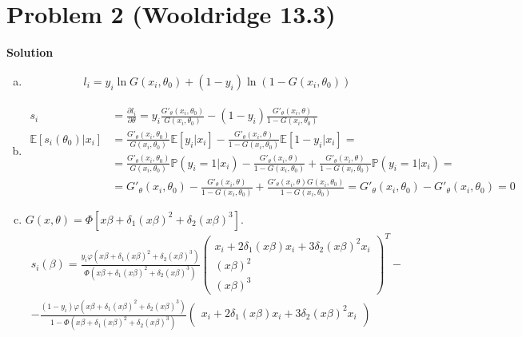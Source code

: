 \documentclass[a4paper]{article}
\newcommand{\prob}{\mathbb{P}}
\newcommand{\expect}{\mathbb{E}}
\begin{document}
	\section*{Problem 2 (Wooldridge 13.3)}
	
	
	
	
	\textbf{Solution}
	
	
	
	\begin{enumerate}[a.]
		\item 
		\begin{align*}
		l_i = y_i \ln G(x_i, \theta_0) + (1 - y_i) \ln (1 - G(x_i, \theta_0))
		\end{align*}
		\item 
		\begin{align*}
		s_i &= \frac{\partial l_i}{\partial \theta} = y_i \frac{G'_{\theta}(x_i, \theta_0)}{G(x_i, \theta_0)} - (1 - y_i) \frac{G'_{\theta}(x_i, \theta)}{1 - G(x_i, \theta_0)}\\
		\expect[s_i(\theta_0)|x_i] &= \frac{G'_{\theta}(x_i, \theta_0)}{G(x_i, \theta_0)} \expect[y_i|x_i] - \frac{G'_{\theta}(x_i, \theta)}{1 - G(x_i, \theta_0)} \expect[1-y_i|x_i] = \\
		&=\frac{G'_{\theta}(x_i, \theta_0)}{G(x_i, \theta_0)} \prob(y_i=1|x_i) - \frac{G'_{\theta}(x_i, \theta)}{1 - G(x_i, \theta_0)} + \frac{G'_{\theta}(x_i, \theta)}{1 - G(x_i, \theta_0)} \prob(y_i=1|x_i) = \\
		&=G'_{\theta}(x_i, \theta_0) - \frac{G'_{\theta}(x_i, \theta)}{1 - G(x_i, \theta_0)} + \frac{G'_{\theta}(x_i, \theta)G(x_i, \theta_0)}{1 - G(x_i, \theta_0)} = G'_{\theta}(x_i, \theta_0) - G'_{\theta}(x_i, \theta_0) = 0
		\end{align*}
		\item $G(x, \theta) = \Phi[x\beta + \delta_1(x\beta)^2 + \delta_2(x\beta)^3]$.
		\begin{align*}
		s_i(\beta) = \frac{y_i\varphi(x\beta + \delta_1(x\beta)^2 + \delta_2(x\beta)^3)}{\Phi(x\beta + \delta_1(x\beta)^2 + \delta_2(x\beta)^3)}\begin{pmatrix} x_i + 2\delta_1(x \beta)x_i + 3 \delta_2 (x\beta)^2x_i\\
		(x \beta)^2\\
		(x \beta)^3
		\end{pmatrix}^T	-\\
		- \frac{(1-y_i)\varphi(x\beta + \delta_1(x\beta)^2 + \delta_2(x\beta)^3)}{1-\Phi(x\beta + \delta_1(x\beta)^2 + \delta_2(x\beta)^3)}\begin{pmatrix} x_i + 2\delta_1(x \beta)x_i + 3 \delta_2 (x\beta)^2x_i\\

\end{pmatrix}
\end{align*}
\end{enumerate}
\end{document}
